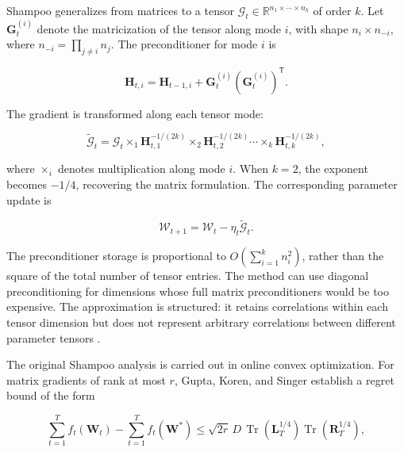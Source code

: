 Shampoo generalizes from matrices to a tensor
$\mathcal{G}_t\in
\mathbb{R}^{n_1\times\cdots\times n_k}$ of order $k$. Let
$\mathbf{G}^{(i)}_t$ denote the matricization of the tensor along
mode $i$, with shape $n_i\times n_{-i}$, where
$n_{-i}=\prod_{j\ne i}n_j$. The preconditioner for mode $i$ is

\begin{equation}
    \mathbf{H}_{t,i}
    =
    \mathbf{H}_{t-1,i}
    +
    \mathbf{G}^{(i)}_t
    \left(\mathbf{G}^{(i)}_t\right)^{\mathsf{T}}.
    \label{eq:opt-shampoo-tensor-preconditioner}
\end{equation}

The gradient is transformed along each tensor mode:

\begin{equation}
    \widetilde{\mathcal{G}}_t
    =
    \mathcal{G}_t
    \times_1\mathbf{H}_{t,1}^{-1/(2k)}
    \times_2\mathbf{H}_{t,2}^{-1/(2k)}
    \cdots
    \times_k\mathbf{H}_{t,k}^{-1/(2k)},
    \label{eq:opt-shampoo-tensor-transform}
\end{equation}

where $\times_i$ denotes multiplication along mode $i$. When $k=2$,
the exponent becomes $-1/4$, recovering the matrix formulation.
The corresponding parameter update is

\begin{equation}
    \mathcal{W}_{t+1}
    =
    \mathcal{W}_t-\eta_t\widetilde{\mathcal{G}}_t.
    \label{eq:opt-shampoo-tensor-update}
\end{equation}

The preconditioner storage is proportional to
$O(\sum_{i=1}^{k}n_i^2)$, rather than the square of the total number
of tensor entries. The method can use diagonal preconditioning for
dimensions whose full matrix preconditioners would be too expensive.
The approximation is structured: it retains correlations within each
tensor dimension but does not represent arbitrary correlations between
different parameter tensors \parencite{Gupta2018Shampoo}.

The original Shampoo analysis is carried out in online convex
optimization. For matrix gradients of rank at most $r$, Gupta, Koren,
and Singer establish a regret bound of the form

\begin{equation}
    \sum_{t=1}^{T} f_t(\mathbf{W}_t)
    -
    \sum_{t=1}^{T} f_t(\mathbf{W}^{*})
    \leq
    \sqrt{2r}\,D\,
    \operatorname{Tr}(\mathbf{L}_T^{1/4})
    \operatorname{Tr}(\mathbf{R}_T^{1/4}),
    \label{eq:opt-shampoo-regret}
\end{equation}

